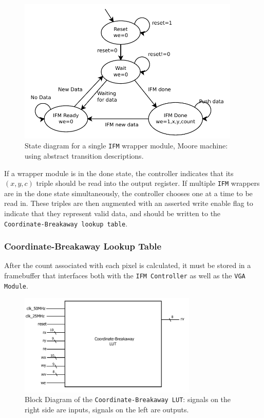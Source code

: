 \documentclass{article}
\begin{document}
\begin{figure}[H]
  \centering
    \includegraphics[width=300pt]{state_diagrams/ifmunit.pdf}
  \caption{State diagram for a single \texttt{IFM} wrapper module,
    Moore machine: using abstract transition descriptions.}
\end{figure}

If a wrapper module is in the done state, the controller indicates that its $(x, y, c)$ triple should be read into
the output register. If multiple \texttt{IFM} wrappers are in the done state simultaneously, the controller chooses one at a
time to be read in. These triples are then augmented with an asserted write enable flag to indicate that they represent
valid data, and should be written to the \texttt{Coordinate-Breakaway lookup table}. 


\subsubsection{Coordinate-Breakaway Lookup Table}

After the count associated with each pixel is calculated, it must be
stored in a framebuffer that interfaces both with the \texttt{IFM
Controller} as well as the \texttt{VGA Module}.

\begin{figure}[H]
  \centering
    \includegraphics[width=240pt]{block_diagrams/clut.pdf}
  \caption{Block Diagram of the \texttt{Coordinate-Breakaway LUT}: signals on
    the right side are inputs, signals on the left are outputs.}
\end{figure}
\end{document}
